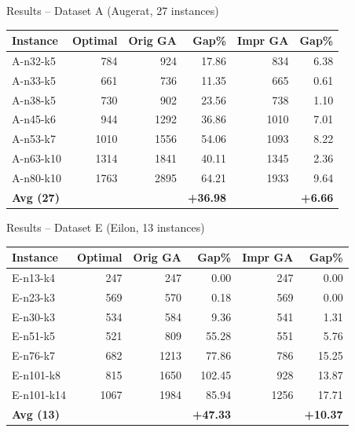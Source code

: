 \documentclass{beamer}
\begin{document}
\begin{frame}{Results -- Dataset A (Augerat, 27 instances)}
  \begin{center}
  \small
  \begin{tabular}{lrrrrr}
    \toprule
    Instance & Optimal & Orig GA & Gap\% & Impr GA & Gap\% \\
    \midrule
    A-n32-k5  & 784  & 924  & 17.86 & 834  & 6.38 \\
    A-n33-k5  & 661  & 736  & 11.35 & 665  & 0.61 \\
    A-n38-k5  & 730  & 902  & 23.56 & 738  & 1.10 \\
    A-n45-k6  & 944  & 1292 & 36.86 & 1010 & 7.01 \\
    A-n53-k7  & 1010 & 1556 & 54.06 & 1093 & 8.22 \\
    A-n63-k10 & 1314 & 1841 & 40.11 & 1345 & 2.36 \\
    A-n80-k10 & 1763 & 2895 & 64.21 & 1933 & 9.64 \\
    \midrule
    \textbf{Avg (27)} & & & \textbf{+36.98} & & \textbf{+6.66} \\
    \bottomrule
  \end{tabular}
  \end{center}
\end{frame}

\begin{frame}{Results -- Dataset E (Eilon, 13 instances)}
  \begin{center}
  \small
  \begin{tabular}{lrrrrr}
    \toprule
    Instance & Optimal & Orig GA & Gap\% & Impr GA & Gap\% \\
    \midrule
    E-n13-k4   & 247  & 247  & 0.00   & 247  & 0.00  \\
    E-n23-k3   & 569  & 570  & 0.18   & 569  & 0.00  \\
    E-n30-k3   & 534  & 584  & 9.36   & 541  & 1.31  \\
    E-n51-k5   & 521  & 809  & 55.28  & 551  & 5.76  \\
    E-n76-k7   & 682  & 1213 & 77.86  & 786  & 15.25 \\
    E-n101-k8  & 815  & 1650 & 102.45 & 928  & 13.87 \\
    E-n101-k14 & 1067 & 1984 & 85.94  & 1256 & 17.71 \\
    \midrule
    \textbf{Avg (13)} & & & \textbf{+47.33} & & \textbf{+10.37} \\
    \bottomrule
  \end{tabular}
  \end{center}
\end{frame}
\end{document}
